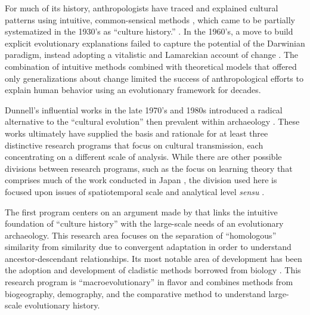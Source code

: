 For much of its history, anthropologists have traced and explained cultural patterns using intuitive, common-sensical methods , which came to be partially systematized in the 1930's as ``culture history.'' \citep{lyman1997rise,lyman2001direct,Lyman2003a,lyman2008cultural,o1998james,o2000time}.  In the 1960's, a move to build explicit evolutionary explanations failed to capture the potential of the Darwinian paradigm, instead adopting a vitalistic and Lamarckian account of change \citep{Dunnell1980}.  The combination of intuitive methods combined with theoretical models that offered only generalizations about change limited the success of anthropological efforts to explain human behavior using an evolutionary framework for decades. 

Dunnell's influential works in the late 1970's and 1980s introduced a radical alternative to the ``cultural evolution'' then prevalent within archaeology \citep{Dunnell1978,dunnell1982harvey,Dunnell1980,Dunnell1989}.  These works ultimately have supplied the basis and rationale for at least three distinctive research programs that focus on cultural transmission, each concentrating on a different scale of analysis.  While there are other possible divisions between research programs, such as the focus on learning theory that comprises much of the work conducted in Japan , the division used here is focused upon issues of spatiotemporal scale and analytical level \emph{sensu} \citet{Dunnell1971}.  

The first program centers on an argument made by \citet{Dunnell1978} that links the intuitive foundation of ``culture history'' with the large-scale needs of an evolutionary archaeology.  This research area focuses on the separation of ``homologous'' similarity from similarity due to convergent adaptation in order to understand ancestor-descendant relationships.  Its most notable area of development has been the adoption and development of cladistic methods borrowed from biology \citep{borgerhoff2006cultural,Lyman1997a,Lyman2006a,o1999seriation,o2000time,o2001cladistics,o2003cladistics,o2003resolving,OBrian2000,prentiss2019cultural,PRENTISS201564,Temkin2007}.  This research program is ``macroevolutionary'' in flavor and combines methods from biogeography, demography, and the comparative method to understand large-scale evolutionary history.  

